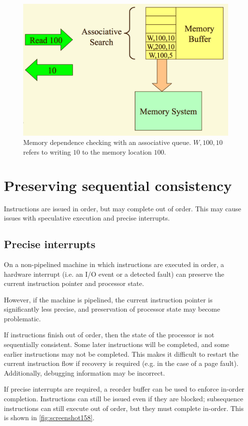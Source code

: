 \begin{figure}
\centering
\includegraphics[width=0.7\linewidth]{figures/screenshot157}
\caption[Memory dependence checking.]{Memory dependence checking with an associative queue. $W,100,10$ refers to writing $10$ to the memory location $100$.}
\label{fig:screenshot157}
\end{figure}

\section{Preserving sequential consistency}
Instructions are issued in order, but may complete out of order. This may cause issues with speculative execution and precise interrupts.

\subsection{Precise interrupts}
On a non-pipelined machine in which instructions are executed in order, a hardware interrupt (i.e. an I/O event or a detected fault) can preserve the current instruction pointer and processor state.

However, if the machine is pipelined, the current instruction pointer is significantly less precise, and preservation of processor state may become problematic.

If instructions finish out of order, then the state of the processor is not sequentially consistent. Some later instructions will be completed, and some earlier instructions may not be completed. This makes it difficult to restart the current instruction flow if recovery is required (e.g. in the case of a page fault). Additionally, debugging information may be incorrect.

If precise interrupts are required, a reorder buffer can be used to enforce in-order completion. Instructions can still be issued even if they are blocked; subsequence instructions can still execute out of order, but they must complete in-order. This is shown in \autoref{fig:screenshot158}.


